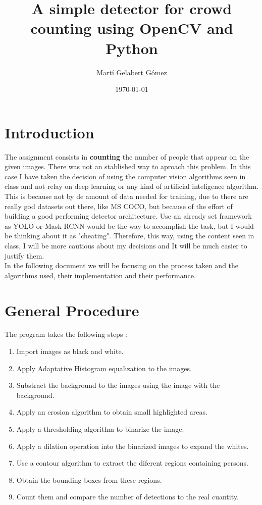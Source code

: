 \documentclass[10pt]{article}
\begin{document}
\title{A simple detector for crowd counting using OpenCV and Python}
\author{Martí Gelabert Gómez}
\date{\today}
\maketitle

\tableofcontents
\section{Introduction}
The assignment consists in \textbf{counting} the number of people that appear on the given images. There was not an stablished way to aproach this problem. In this case I have taken the decision of using the computer vision algorithms seen in class and not relay on deep learning or any kind of artificial inteligence algorithm. This is because not by de amount of data needed for training, due to there are really god datasets out there, like MS COCO, but because of the effort of building a good performing detector architecture. Use an already set framework as YOLO or Mask-RCNN would be the way to accomplish the task, but I would be thinking about it as "cheating". Therefore, this way, using the content seen in class, I will be more cautious about my decisions and It will be much easier to justify them.\\

In the following document  we will be focusing on the process taken and the algorithms used, their implementation and their performance.        

\section{General Procedure}
The program takes the following steps :

\begin{enumerate}
    \item Import images as black and white.
    \item Apply Adaptative Histogram equalization to the images.
    \item Substract the background to the images using the image with the background.
    \item Apply an erosion algorithm to obtain small highlighted areas.
    \item Apply a thresholding algorithm to binarize the image.
    \item Apply a dilation operation into the binarized images to expand the whites.
    \item Use a contour algorithm to extract the diferent regions containing persons.
    \item Obtain the bounding boxes from these regions.
    \item Count them and compare the number of detections to the real cuantity.
    \end{enumerate}
    
\end{document}
